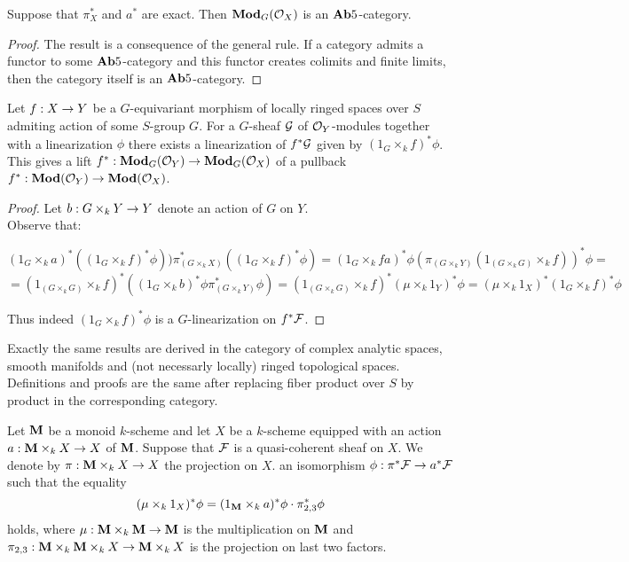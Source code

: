 \begin{corollary}
Suppose that $\pi^*_X$ and $a^*$ are exact. Then $\mathbf{Mod}_G({\mathcal O}_X)$ is an $\mathbf{Ab}5$-category.
\end{corollary}
\begin{proof}
The result is a consequence of the general rule. If a category admits a functor to some $\mathbf{Ab}5$-category and this functor creates colimits and finite limits, then the  category itself is an $\mathbf{Ab}5$-category.
\end{proof}

\begin{proposition}
Let $f:X\rightarrow Y$ be a $G$-equivariant morphism of locally ringed spaces over $S$ admiting action of some $S$-group $G$. For a $G$-sheaf ${\mathcal G}$ of ${\mathcal O}_Y$-modules together with a linearization $\phi$ there exists a linearization of $f^*{\mathcal G}$ given by $(1_G\times_k f)^*\phi$. This gives a lift $f^*:\mathbf{Mod}_G({\mathcal O}_Y)\rightarrow \mathbf{Mod}_G({\mathcal O}_X)$ of a pullback $f^*:\mathbf{Mod}({\mathcal O}_Y)\rightarrow \mathbf{Mod}({\mathcal O}_X)$.
\end{proposition}
\begin{proof}
Let $b:G\times_kY\rightarrow Y$ denote an action of $G$ on $Y$.\\
Observe that:
\begin{center}
$(1_G\times_ka)^*((1_G\times_kf)^*\phi))\pi_{(G\times_kX)}^*((1_G\times_kf)^*\phi)=(1_G\times_kfa)^*\phi (\pi_{(G\times_kY)}(1_{(G\times_kG)}\times_kf))^*\phi=$\\$=(1_{(G\times_kG)}\times_kf)^*((1_G\times_kb)^*\phi \pi_{(G\times_kY)}^*\phi)=(1_{(G\times_kG)}\times_kf)^*(\mu\times_k1_Y)^*\phi=(\mu\times_k1_X)^*(1_G\times_kf)^*\phi$
\end{center}
Thus indeed $(1_G\times_kf)^*\phi$ is a $G$-linearization on $f^*{\mathcal F}$. 
\end{proof}

\begin{remark}
Exactly the same results are derived in the category of complex analytic spaces, smooth manifolds and (not necessarly locally) ringed topological spaces. Definitions and proofs are the same after replacing fiber product over $S$ by product in the corresponding category.
\end{remark}

\begin{theorem}
Let $\mathbf{M}$ be a monoid $k$-scheme and let $X$ be a $k$-scheme equipped with an action $a:\mathbf{M} \times_k X \rightarrow X$ of $\mathbf{M}$. Suppose that ${\mathcal F}$ is a quasi-coherent sheaf on $X$. We denote by $\pi: \mathbf{M}\times_kX\rightarrow X$ the projection on $X$.
an isomorphism $\phi:\pi^*{\mathcal F} \rightarrow a^* {\mathcal F}$ such that the equality
$$(\mu\times_k1_X)^*\phi = (1_{\mathbf{M}} \times_k a)^*\phi \cdot \pi_{2,3}^*\phi$$
holds, where $\mu: \mathbf{M} \times_k \mathbf{M} \rightarrow \mathbf{M}$ is the multiplication on $\mathbf{M}$ and $\pi_{2,3}:\mathbf{M}\times_k \mathbf{M} \times_k X \rightarrow \mathbf{M} \times_kX$ is the projection on last two factors.
\end{theorem}





\small




